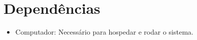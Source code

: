 \chapter{Dependências}

\begin{itemize}
   \item Computador: Necessário para hospedar e rodar o sistema.	
\end{itemize}

